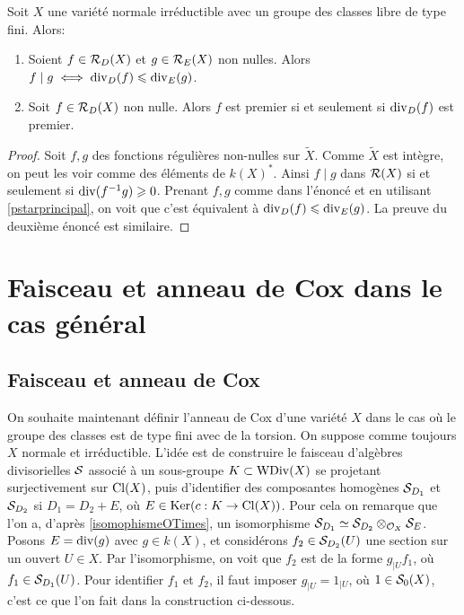 \begin{prop}\label{divisibilitePropsFreeCox}
Soit $X$ une variété normale irréductible avec un groupe des classes libre de type fini.  Alors:
\begin{enumerate}
\item Soient $f\in \mathcal{R}_D(X)$ et $g\in \mathcal{R}_E(X)$ non nulles. Alors $f\mid g\iff \operatorname{div}_D(f)\leqslant\operatorname{div}_E(g)$.
\item Soit $f\in \mathcal{R}_D(X)$ non nulle. Alors $f$ est premier si et seulement si $\operatorname{div}_D(f)$ est premier.
\end{enumerate}
\end{prop}
\begin{proof}
Soit $f,g$ des fonctions régulières non-nulles sur $\widetilde{X}$. Comme $\widetilde{X}$ est intègre, on peut les voir comme des éléments de $k(X)^*$. Ainsi $f\mid g$ dans $\mathcal{R}(X)$ si et seulement si $\operatorname{div}(f^{-1}g)\geqslant 0$. Prenant $f,g$ comme dans l'énoncé et en utilisant \ref{pstarprincipal}, on voit que c'est équivalent à $\operatorname{div}_D(f)\leqslant\operatorname{div}_E(g)$. La preuve du deuxième énoncé est similaire.
\end{proof}

\section{Faisceau et anneau de Cox dans le cas général}

\subsection{Faisceau et anneau de Cox}

On souhaite maintenant définir l'anneau de Cox d'une variété $X$ dans le cas où le groupe des classes est de type fini avec de la torsion. On suppose comme toujours $X$
normale et irréductible. L'idée est de construire le faisceau d'algèbres divisorielles $\mathcal{S}$ associé à un sous-groupe $K\subset \operatorname{WDiv}(X)$ se projetant surjectivement sur $\operatorname{Cl}(X)$, puis d'identifier des composantes homogènes $\mathcal{S}_{D_1}$ et  $\mathcal{S}_{D_2}$ si $D_1=D_2+E$, où $E\in \operatorname{Ker} (c:K\rightarrow \operatorname{Cl}(X))$. Pour cela on remarque que l'on a, d'après \ref{isomophismeOTimes}, un isomorphisme $\mathcal{S}_{D_1}\simeq \mathcal{S}_{D_2}\otimes_{\mathcal{O}_X}\mathcal{S}_E$. Posons $E=\operatorname{div}(g)$ avec $g\in k(X)$, et considérons $f_2\in \mathcal{S}_{D_2}(U)$ une section sur un ouvert $U\in X$. Par l'isomorphisme, on voit que $f_2$ est de la forme $g_{|U}f_1$, où $f_1\in \mathcal{S}_{D_1}(U)$. Pour identifier $f_1$ et $f_2$, il faut imposer $g_{|U}=1_{|U}$, où $1\in\mathcal{S}_0(X)$, c'est ce que l'on fait dans la construction ci-dessous.

